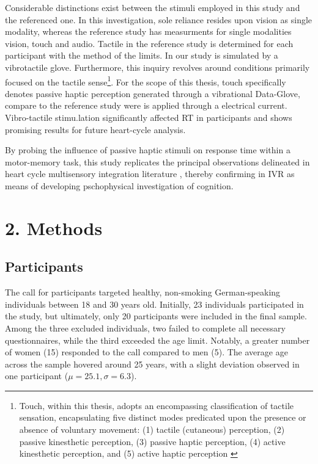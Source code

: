 \documentclass[12pt,oneside,openright]{report}
\begin{document}
Considerable distinctions exist between the stimuli employed in this study and the referenced one. In this investigation, sole reliance resides upon vision as single modality, whereas the reference study has measurments for single modalities vision, touch and audio. Tactile in the reference study is determined for each participant with the method of the limits. In our study is simulated by a vibrotactile glove. Furthermore, this inquiry revolves around conditions primarily focused on the tactile sense\footnote{Touch, within this thesis, adopts an encompassing classification of tactile sensation, encapsulating five distinct modes predicated upon the presence or absence of voluntary movement: (1) tactile (cutaneous) perception, (2) passive kinesthetic perception, (3) passive haptic perception, (4) active kinesthetic perception, and (5) active haptic perception \parencite{Healy2003HandbookOP}}. For the scope of this thesis, touch specifically denotes passive haptic perception generated through a vibrational Data-Glove, compare to the reference study were is applied through a electrical current. Vibro-tactile stimu.lation significantly affected RT in participants and shows promising results for future heart-cycle analysis.

By probing the influence of passive haptic stimuli on response time within a motor-memory task, this study replicates the principal observations delineated in heart cycle multisensory integration literature \parencite{SALTAFOSSI2023108642}, thereby confirming in IVR as means of developing pschophysical investigation of cognition.


\section*{2. Methods}
\subsection*{Participants}
The call for participants targeted healthy, non-smoking German-speaking individuals between 18 and 30 years old. Initially, 23 individuals participated in the study, but ultimately, only 20 participants were included in the final sample. Among the three excluded individuals, two failed to complete all necessary questionnaires, while the third exceeded the age limit. Notably, a greater number of women (15) responded to the call compared to men (5). The average age across the sample hovered around 25 years, with a slight deviation observed in one participant ($\mu=25.1, \sigma=6.3$).
\end{document}
